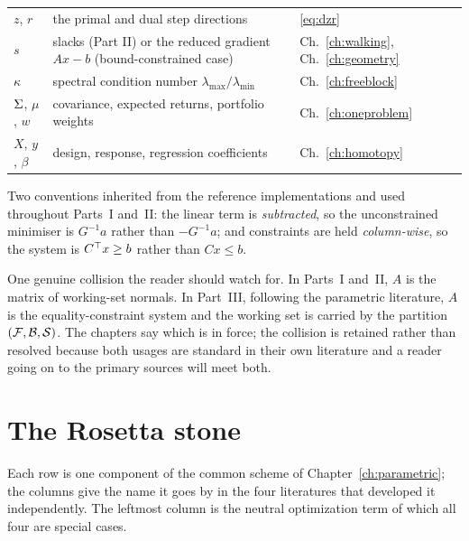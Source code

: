 \begin{center}
\begin{tabular}{@{}lll@{}}
$z$, $r$ & the primal and dual step directions & \eqref{eq:dzr} \\
$s$ & slacks (Part II) or the reduced gradient $Ax - b$ (bound-constrained case)
         & Ch.~\ref{ch:walking}, Ch.~\ref{ch:geometry} \\
$\kappa$ & spectral condition number $\lambda_{\max}/\lambda_{\min}$
         & Ch.~\ref{ch:freeblock} \\
$\Sigma$, $\mu$, $w$ & covariance, expected returns, portfolio weights
         & Ch.~\ref{ch:oneproblem} \\
$X$, $y$, $\beta$ & design, response, regression coefficients
         & Ch.~\ref{ch:homotopy} \\
\bottomrule
\end{tabular}
\end{center}

Two conventions inherited from the reference implementations and used throughout
Parts~I and~II: the linear term is \emph{subtracted}, so the unconstrained minimiser is
$G^{-1}a$ rather than $-G^{-1}a$; and constraints are held \emph{column-wise}, so the
system is $C^{\top} x \ge b$ rather than $Cx \le b$.

One genuine collision the reader should watch for. In Parts~I and~II, $A$ is the matrix
of working-set normals. In Part~III, following the parametric literature, $A$ is the
equality-constraint system and the working set is carried by the partition
$(\mathcal{F},\mathcal{B},\mathcal{S})$. The chapters say which is in force; the collision is
retained rather than resolved because both usages are standard in their own literature
and a reader going on to the primary sources will meet both.

\section{The Rosetta stone}

Each row is one component of the common scheme of Chapter~\ref{ch:parametric}; the
columns give the name it goes by in the four literatures that developed it
independently. The leftmost column is the neutral optimization term of which all four
are special cases.

